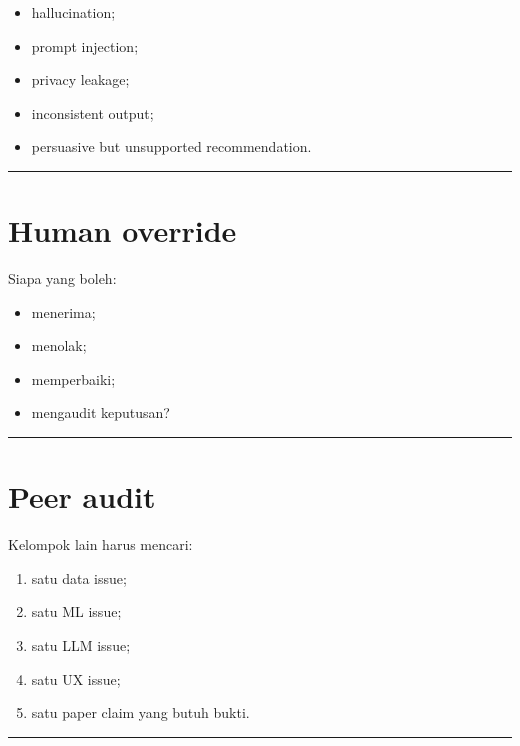 \documentclass[
  indonesian,
  letterpaper,
  DIV=11,
  numbers=noendperiod]{scrreprt}
\providecommand{\tightlist}{%
  \setlength{\itemsep}{0pt}\setlength{\parskip}{0pt}}
\begin{document}
\begin{itemize}
\tightlist
\item
  hallucination;
\item
  prompt injection;
\item
  privacy leakage;
\item
  inconsistent output;
\item
  persuasive but unsupported recommendation.
\end{itemize}

\begin{center}\rule{0.5\linewidth}{0.5pt}\end{center}

\section{Human override}\label{human-override}

Siapa yang boleh:

\begin{itemize}
\tightlist
\item
  menerima;
\item
  menolak;
\item
  memperbaiki;
\item
  mengaudit keputusan?
\end{itemize}

\begin{center}\rule{0.5\linewidth}{0.5pt}\end{center}

\section{Peer audit}\label{peer-audit}

Kelompok lain harus mencari:

\begin{enumerate}
\def\labelenumi{\arabic{enumi}.}
\tightlist
\item
  satu data issue;
\item
  satu ML issue;
\item
  satu LLM issue;
\item
  satu UX issue;
\item
  satu paper claim yang butuh bukti.
\end{enumerate}

\begin{center}\rule{0.5\linewidth}{0.5pt}\end{center}
\end{document}
